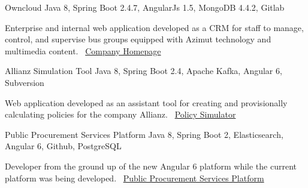 \documentclass[]{awesome-cv}
\begin{document}
\begin{cventries}
	\vspace{-3mm}
	\cventry
	{}
	{Owncloud \vspace{-5mm}}
	{Java 8, Spring Boot 2.4.7, AngularJs 1.5, MongoDB 4.4.2, Gitlab \vspace{-5mm}}
	{}
	{\begin{cvsectionnormaltext}
		\item {Enterprise and internal web application developed as a CRM for staff to manage, control, and supervise bus groups equipped with Azimut technology and multimedia content. 
		\newline \faLink\ \href{https://www.azimutelectronics.com}{Company Homepage}}
	\end{cvsectionnormaltext}}

	\vspace{-3mm}
	\cventry
	{}
	{Allianz Simulation Tool \vspace{-5mm}}
	{Java 8, Spring Boot 2.4, Apache Kafka, Angular 6, Subversion \vspace{-5mm}}
	{}
	{\begin{cvsectionnormaltext}
		\item{Web application developed as an assistant tool for creating and provisionally calculating policies for the company Allianz.
      \newline \faLink\ \href{https://www.allianzdirect.es/seguro-de-coche/calcular-precio/}{Policy Simulator}}
	\end{cvsectionnormaltext}}
	
	\vspace{-3mm}
	\cventry
	{}
	{Public Procurement Services Platform \vspace{-5mm}}
	{Java 8, Spring Boot 2, Elasticsearch, Angular 6, Github, PostgreSQL \vspace{-5mm}}
	{}
	{\begin{cvsectionnormaltext}
		\item{Developer from the ground up of the new Angular 6 platform while the current platform was being developed.
		\newline \faLink\ \href{https://contractaciopublica.cat/ca/inici}{Public Procurement Services Platform}}
	\end{cvsectionnormaltext}}
	\vspace{-5mm}
\end{cventries}
\end{document}
